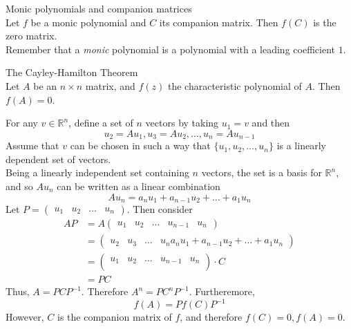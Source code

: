 \documentclass[journal, letterpaper]{IEEEtran}
\begin{document}
    \begin{myboxr}{Monic polynomials and companion matrices} \\ 
        Let $f$ be a monic polynomial and $C$ its companion matrix. Then $f(C)$ is the zero matrix.
        \newline \\ 
        Remember that a \textit{monic} polynomial is a polynomial with a leading coefficient $1$.
    \end{myboxr}
    \begin{mybox}{The Cayley-Hamilton Theorem} \\ 
        Let $A$ be an $n \times n$ matrix, and $f(z)$ the characteristic polynomial of $A$. Then $f(A) = 0$.
    \end{mybox}
    For any $v \in \mathbb{R}^n$, define a set of $n$ vectors by taking $u_1 = v$ and then
    $$ u_2 = Au_1, u_3 = Au_2, \dots, u_n = Au_{n-1}$$
    Assume that $v$ can be chosen in such a way that $\{u_1, u_2, \dots, u_n \}$ is a linearly dependent set of
    vectors.
    \newline \\ 
    Being a linearly independent set containing $n$ vectors, the set is a basis for $\mathbb{R}^n$, and so $Au_n$ can be written as a linear combination
    $$ Au_n = a_nu_1 + a_{n-1}u_2 + \dots + a_1u_n$$
    Let $P = \begin{pmatrix}
        u_1 & u_2 & \dots & u_n
    \end{pmatrix}$. Then consider
    \begin{align*}
    AP &= A\begin{pmatrix}
        u_1 & u_2 & \dots & u_{n-1} & u_n
    \end{pmatrix} \\ 
    &= \begin{pmatrix}
        u_2 & u_3 & \dots & u_n a_nu_1 + a_{n-1}u_2 + \dots + a_1u_n
    \end{pmatrix} \\ 
    &= \begin{pmatrix}
        u_1 & u_2 & \dots & u_{n-1} & u_n \\ 
    \end{pmatrix} \cdot C\\ 
    &= PC
    \end{align*}
    Thus, $A = PCP^{-1}$. Therefore $A^n = PC^nP^{-1}$. Furtheremore,
    $$ f(A) = Pf(C)P^{-1}$$
    However, $C$ is the companion matrix of $f$, and therefore $f(C) = 0, f(A) = 0$.
\end{document}

